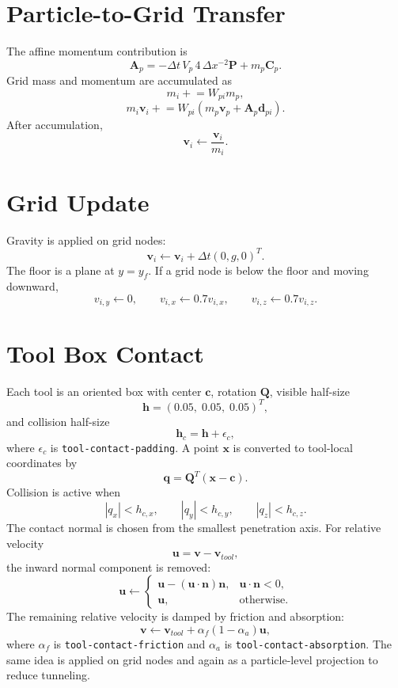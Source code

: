 \documentclass[11pt,a4paper]{article}
\begin{document}
\section{Particle-to-Grid Transfer}

The affine momentum contribution is
\[
  \bm{A}_p =
  -\Delta t\,V_p\,4\,\Delta x^{-2}\bm{P}
  +
  m_p\bm{C}_p .
\]
Grid mass and momentum are accumulated as
\[
  m_i \mathrel{+}= W_{pi}m_p,
\]
\[
  m_i\bm{v}_i \mathrel{+}=
  W_{pi}
  \left(
    m_p\bm{v}_p + \bm{A}_p\bm{d}_{pi}
  \right).
\]
After accumulation,
\[
  \bm{v}_i \leftarrow \frac{\bm{v}_i}{m_i}.
\]

\section{Grid Update}

Gravity is applied on grid nodes:
\[
  \bm{v}_i \leftarrow \bm{v}_i + \Delta t(0,g,0)^T .
\]
The floor is a plane at $y=y_f$. If a grid node is below the floor and moving
downward,
\[
  v_{i,y}\leftarrow 0,
  \qquad
  v_{i,x}\leftarrow 0.7v_{i,x},
  \qquad
  v_{i,z}\leftarrow 0.7v_{i,z}.
\]

\section{Tool Box Contact}

Each tool is an oriented box with center $\bm{c}$, rotation $\bm{Q}$, visible
half-size
\[
  \bm{h} = (0.05,\;0.05,\;0.05)^T,
\]
and collision half-size
\[
  \bm{h}_c = \bm{h} + \epsilon_c,
\]
where $\epsilon_c$ is \texttt{tool-contact-padding}. A point $\bm{x}$ is
converted to tool-local coordinates by
\[
  \bm{q} = \bm{Q}^T(\bm{x}-\bm{c}).
\]
Collision is active when
\[
  |q_x| < h_{c,x},\qquad
  |q_y| < h_{c,y},\qquad
  |q_z| < h_{c,z}.
\]
The contact normal is chosen from the smallest penetration axis. For relative
velocity
\[
  \bm{u} = \bm{v}-\bm{v}_{tool},
\]
the inward normal component is removed:
\[
  \bm{u} \leftarrow
  \begin{cases}
    \bm{u} - (\bm{u}\cdot\bm{n})\bm{n},
      & \bm{u}\cdot\bm{n}<0,\\
    \bm{u},
      & \text{otherwise}.
  \end{cases}
\]
The remaining relative velocity is damped by friction and absorption:
\[
  \bm{v}\leftarrow
  \bm{v}_{tool}
  +
  \alpha_f(1-\alpha_a)\bm{u},
\]
where $\alpha_f$ is \texttt{tool-contact-friction} and $\alpha_a$ is
\texttt{tool-contact-absorption}. The same idea is applied on grid nodes and
again as a particle-level projection to reduce tunneling.
\end{document}
